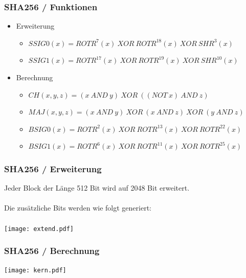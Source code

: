 \documentclass{beamer}
\begin{document}
    \begin{frame}
      \frametitle{SHA256 / Funktionen}
      \begin{itemize}
      \setlength{\itemsep}{20pt}
      \item Erweiterung
        \begin{itemize}
          \setlength{\itemsep}{10pt}
          \item $ SSIG0(x) = ROTR^{7}(x)~XOR~ROTR^{18}(x)~XOR~SHR^{3}(x) $
          \item $ SSIG1(x) = ROTR^{17}(x)~XOR~ROTR^{19}(x)~XOR~SHR^{10}(x) $
        \end{itemize}
      \item Berechnung
        \begin{itemize}
          \setlength{\itemsep}{10pt}
          \item $ CH( x, y, z) = (x~AND~y)~XOR~( (NOT~x)~AND~z) $
          \item $ MAJ( x, y, z) = (x~AND~y)~XOR~(x~AND~z)~XOR~(y~AND~z) $
          \item $ BSIG0(x) = ROTR^{2}(x)~XOR~ROTR^{13}(x)~XOR~ROTR^{22}(x) $
          \item $ BSIG1(x) = ROTR^{6}(x)~XOR~ROTR^{11}(x)~XOR~ROTR^{25}(x) $
        \end{itemize}
      \end{itemize}
    \end{frame}
    \begin{frame}
      \frametitle{SHA256 / Erweiterung}
      Jeder Block der Länge 512 Bit wird auf 2048 Bit erweitert.\\
      ~\\
      Die zusätzliche Bits werden wie folgt generiert:\\
      ~\\
      \texttt{[image: extend.pdf]}
    \end{frame}
    \begin{frame}
      \frametitle{SHA256 / Berechnung}
      \texttt{[image: kern.pdf]}
    \end{frame}
\end{document}
